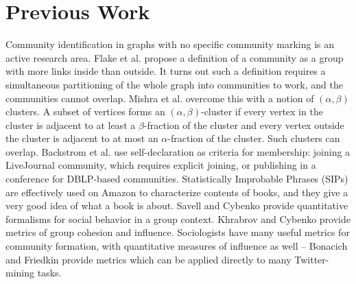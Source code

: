 \section{Previous Work}

Community identification in graphs with no specific community marking is an active research area.  Flake et al. \cite{DBLP:conf/kdd/FlakeLG00} propose a definition of a community as a group with more links inside than outside.  It turns out such a definition requires a simultaneous partitioning of the whole graph into communities to work, and the communities cannot overlap.  Mishra et al. \cite{DBLP:conf/waw/MishraSST07} overcome this with a notion of $(\alpha,\beta)$ clusters.  A subset of vertices forms an $(\alpha,\beta)$-cluster if every vertex in the cluster is adjacent to at least a $\beta$-fraction of the cluster and every vertex outside the cluster is adjacent to at most an $\alpha$-fraction of the cluster.  Such clusters can overlap.  Backstrom et al. \cite{DBLP:conf/kdd/BackstromHKL06} use self-declaration as criteria for membership: joining a LiveJournal community, which requires explicit joining, or publishing in a conference for DBLP-based communities.  Statistically Improbable Phrases (SIPs) are effectively used on Amazon to characterize contents of books, and they give a very good idea of what a book is about.  Savell and Cybenko \cite{Savell_2008} provide quantitative formalisms for social behavior in a group context.  Khrabrov and Cybenko \cite{Khrabrov_kdd2010} provide metrics of group cohesion and influence.  Sociologists have many useful metrics for community formation, with quantitative measures of influence as well -- Bonacich \cite{Bonacich_2001} and Friedkin \cite{Friedkin_Influence} provide metrics which can be applied directly to many Twitter-mining tasks.
